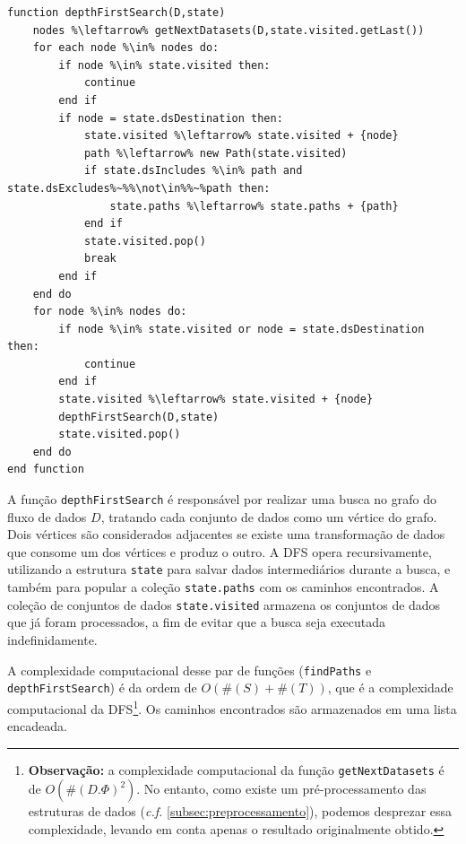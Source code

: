 \begin{minipage}[c]{0.95\textwidth}
\begin{lstlisting}[language=pseudocode,label={lst:algorithm-dfs},caption={[Busca em Profundidade (DFS) dos caminhos]Depth First Search (DFS): busca em profundidade de todos os caminhos entre dois conjuntos de dados.}]
function depthFirstSearch(D,state)
    nodes %\leftarrow% getNextDatasets(D,state.visited.getLast())
    for each node %\in% nodes do:
        if node %\in% state.visited then:
            continue
        end if
        if node = state.dsDestination then:
            state.visited %\leftarrow% state.visited + {node}
            path %\leftarrow% new Path(state.visited)
            if state.dsIncludes %\in% path and state.dsExcludes%~%%\not\in%%~%path then:
                state.paths %\leftarrow% state.paths + {path}
            end if
            state.visited.pop()
            break
        end if
    end do
    for node %\in% nodes do:
        if node %\in% state.visited or node = state.dsDestination then:
            continue
        end if
        state.visited %\leftarrow% state.visited + {node}
        depthFirstSearch(D,state)
        state.visited.pop()
    end do
end function
\end{lstlisting}
\end{minipage}

A função \texttt{depthFirstSearch} é responsável por realizar uma busca no grafo do fluxo de dados \(D\), tratando cada conjunto de dados como um vértice do grafo. Dois vértices são considerados adjacentes se existe uma transformação de dados que consome um dos vértices e produz o outro. A DFS opera recursivamente, utilizando a estrutura \texttt{state} para salvar dados intermediários durante a busca, e também para popular a coleção \texttt{state.paths} com os caminhos encontrados. A coleção de conjuntos de dados \texttt{state.visited} armazena os conjuntos de dados que já foram processados, a fim de evitar que a busca seja executada indefinidamente.

A complexidade computacional desse par de funções (\texttt{findPaths} e \texttt{depthFirstSearch}) é da ordem de \(O(\#(S) + \#(T))\), que é a complexidade computacional da DFS\footnote{\textbf{Observação:} a complexidade computacional da função \texttt{getNextDatasets} é de $O(\#(D.\Phi)^2)$. No entanto, como existe um pré-processamento das estruturas de dados (\textit{c.f.} \autoref{subsec:preprocessamento}), podemos desprezar essa complexidade, levando em conta apenas o resultado originalmente obtido.}. Os caminhos encontrados são armazenados em uma lista encadeada.

